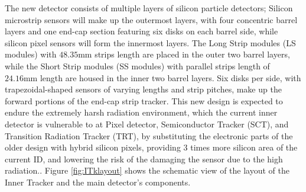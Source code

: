 The new detector consists of multiple layers of silicon particle detectors; Silicon microstrip sensors will make up the outermost layers, with four concentric barrel layers and one end-cap section featuring six disks on each barrel side, while silicon pixel sensors will form the innermost layers. The Long Strip modules (LS modules) with $48.35 \si{\milli\meter}$ strips length are placed in the outer two barrel layers, while the Short Strip modules (SS modules) with parallel strips length of $24.16 \si{\milli\meter}$ length are housed in the inner two barrel layers. Six disks per side, with trapezoidal-shaped sensors of varying lengths and strip pitches, make up the forward portions of the end-cap strip tracker.  This new design is expected to endure the extremely harsh radiation environment, which the current inner detector is vulnerable to at Pixel detector, Semiconductor Tracker (SCT), and Transition Radiation Tracker (TRT), by substituting the electronic parts of the older design with hybrid silicon pixels, providing $3$ times more silicon area of the current ID, and lowering the risk of the damaging the sensor due to the high radiation.\cite{herde2023atlas}. Figure \ref{fig:ITklayout} shows the schematic view of the layout of the Inner Tracker and the main detector's components.\\

